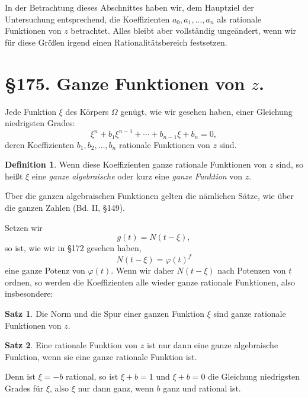 \documentclass[12pt,a4paper]{article}
\theoremstyle{definition}
\newtheorem{defin}{Definition}[section]
\newtheorem{satz}{Satz}[section]
\begin{document}
In der Betrachtung dieses Abschnittes haben wir, dem Hauptziel der Untersuchung entsprechend, die Koeffizienten $a_0, a_1, \ldots, a_n$ als rationale Funktionen von $z$ betrachtet. Alles bleibt aber vollständig ungeändert, wenn wir für diese Größen irgend einen Rationalitätsbereich festsetzen.

\newpage
\section*{\S 175. Ganze Funktionen von $z$.}

Jede Funktion $\xi$ des Körpers $\Omega$ genügt, wie wir gesehen haben, einer Gleichung niedrigsten Grades:
\begin{equation}
\xi^n + b_1\xi^{n-1} + \cdots + b_{n-1}\xi + b_n = 0,
\end{equation}
deren Koeffizienten $b_1, b_2, \ldots, b_n$ rationale Funktionen von $z$ sind.

\begin{defin}
Wenn diese Koeffizienten ganze rationale Funktionen von $z$ sind, so heißt $\xi$ eine \emph{ganze algebraische} oder kurz eine \emph{ganze Funktion} von $z$.
\end{defin}

Über die ganzen algebraischen Funktionen gelten die nämlichen Sätze, wie über die ganzen Zahlen (Bd. II, \S 149).

Setzen wir
\begin{equation}
g(t) = N(t - \xi),
\end{equation}
so ist, wie wir in \S 172 gesehen haben,
\begin{equation}
N(t - \xi) = \varphi(t)^f
\end{equation}
eine ganze Potenz von $\varphi(t)$. Wenn wir daher $N(t - \xi)$ nach Potenzen von $t$ ordnen, so werden die Koeffizienten alle wieder ganze rationale Funktionen, also insbesondere:

\begin{satz}
Die Norm und die Spur einer ganzen Funktion $\xi$ sind ganze rationale Funktionen von $z$.
\end{satz}

\begin{satz}
Eine rationale Funktion von $z$ ist nur dann eine ganze algebraische Funktion, wenn sie eine ganze rationale Funktion ist.
\end{satz}
Denn ist $\xi = -b$ rational, so ist $\xi + b = 1$ und $\xi + b = 0$ die Gleichung niedrigsten Grades für $\xi$, also $\xi$ nur dann ganz, wenn $b$ ganz und rational ist.
\end{document}
